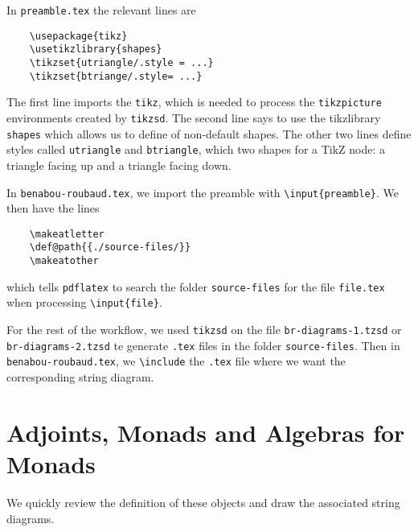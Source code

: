 \documentclass{amsart}
\makeatletter
\def@path{{./source-files/}}
\makeatother
\begin{document}
In \texttt{preamble.tex} the relevant lines are
\begin{verbatim}
    \usepackage{tikz}
    \usetikzlibrary{shapes}
    \tikzset{utriangle/.style = ...}
    \tikzset{btriange/.style= ...}
\end{verbatim}
The first line imports the \texttt{tikz}, which is needed 
    to process the \texttt{tikzpicture} environments
    created by \texttt{tikzsd}.
The second line says to use the tikzlibrary \texttt{shapes}
    which allows us to define of non-default shapes.
The other two lines define styles called \texttt{utriangle}
    and \texttt{btriangle}, which two shapes
    for a TikZ node: a triangle facing up and a triangle
    facing down.

In \texttt{benabou-roubaud.tex}, we import the preamble with
    \texttt{\textbackslash input\{preamble\}}.
We then have the lines
\begin{verbatim}
    \makeatletter
    \def@path{{./source-files/}}
    \makeatother
\end{verbatim}
    which tells \texttt{pdflatex} to search the folder
    \texttt{source-files}
    for the file \texttt{file.tex} when
    processing \texttt{\textbackslash input\{file\}}.

For the rest of the workflow, we used \texttt{tikzsd}
    on the file \texttt{br-diagrams-1.tzsd}
    or \texttt{br-diagrams-2.tzsd}
    te generate \texttt{.tex} files in the
    folder \texttt{source-files}.
Then in \texttt{benabou-roubaud.tex}, we \texttt{\textbackslash include}
    the \texttt{.tex} file where we want the corresponding string diagram.

\section{Adjoints, Monads and Algebras for Monads}
We quickly review the definition of these objects and 
    draw the associated string diagrams.
\end{document}

